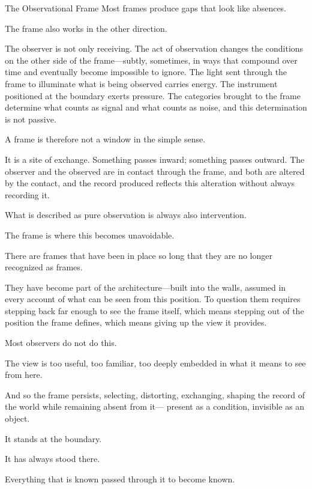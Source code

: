 \begin{interlude}{The Observational Frame}
Most frames produce gaps that look like absences.

\medskip

The frame also works in the other direction.

The observer is not only receiving. The act of observation changes
the conditions on the other side of the frame---subtly, sometimes,
in ways that compound over time and eventually become impossible
to ignore. The light sent through the frame to illuminate what is
being observed carries energy. The instrument positioned at the
boundary exerts pressure. The categories brought to the frame
determine what counts as signal and what counts as noise, and this
determination is not passive.

A frame is therefore not a window in the simple sense.

It is a site of exchange. Something passes inward; something passes
outward. The observer and the observed are in contact through the
frame, and both are altered by the contact, and the record produced
reflects this alteration without always recording it.

What is described as pure observation is always also intervention.

The frame is where this becomes unavoidable.

\medskip

There are frames that have been in place so long that they are no
longer recognized as frames.

They have become part of the architecture---built into the walls,
assumed in every account of what can be seen from this position.
To question them requires stepping back far enough to see the
frame itself, which means stepping out of the position the frame
defines, which means giving up the view it provides.

Most observers do not do this.

The view is too useful, too familiar, too deeply embedded in what
it means to see from here.

And so the frame persists, selecting, distorting, exchanging,
shaping the record of the world while remaining absent from it---
present as a condition, invisible as an object.

It stands at the boundary.

It has always stood there.

Everything that is known passed through it to become known.

\end{interlude}
